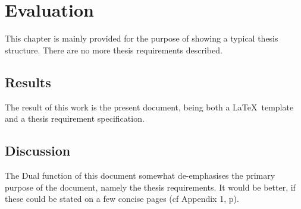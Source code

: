 \chapter{Evaluation}\label{ch:eval}

This chapter is mainly provided for the purpose of showing a typical thesis
structure.  There are no more thesis requirements described.

\section{Results}

The result of this work is the present document, being both a \LaTeX\
template and a thesis requirement specification.

\section{Discussion}

The Dual function of this document somewhat de-emphasises the primary
purpose of the document, namely the thesis requirements.  It would be
better, if these could be stated on a few concise pages (cf Appendix
1, p\pageref{app1}).
